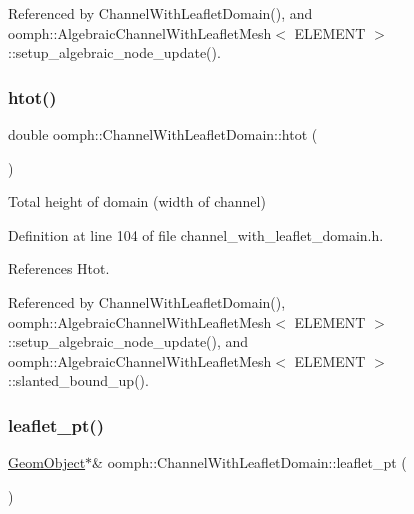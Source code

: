 Referenced by Channel\+With\+Leaflet\+Domain(), and oomph\+::\+Algebraic\+Channel\+With\+Leaflet\+Mesh$<$ E\+L\+E\+M\+E\+N\+T $>$\+::setup\+\_\+algebraic\+\_\+node\+\_\+update().

\mbox{\label{classoomph_1_1ChannelWithLeafletDomain_aaf195c688423473ed97af61f8a1467ab}} 
\subsubsection{\texorpdfstring{htot()}{htot()}}
{\footnotesize\ttfamily double oomph\+::\+Channel\+With\+Leaflet\+Domain\+::htot (\begin{DoxyParamCaption}{ }\end{DoxyParamCaption})\hspace{0.3cm}{\ttfamily [inline]}}



Total height of domain (width of channel) 



Definition at line 104 of file channel\+\_\+with\+\_\+leaflet\+\_\+domain.\+h.



References Htot.



Referenced by Channel\+With\+Leaflet\+Domain(), oomph\+::\+Algebraic\+Channel\+With\+Leaflet\+Mesh$<$ E\+L\+E\+M\+E\+N\+T $>$\+::setup\+\_\+algebraic\+\_\+node\+\_\+update(), and oomph\+::\+Algebraic\+Channel\+With\+Leaflet\+Mesh$<$ E\+L\+E\+M\+E\+N\+T $>$\+::slanted\+\_\+bound\+\_\+up().

\mbox{\label{classoomph_1_1ChannelWithLeafletDomain_a91d7d8d2f564c5e9d2ee07449b2653c9}} 
\subsubsection{\texorpdfstring{leaflet\+\_\+pt()}{leaflet\_pt()}}
{\footnotesize\ttfamily \hyperlink{classoomph_1_1GeomObject}{Geom\+Object}$\ast$\& oomph\+::\+Channel\+With\+Leaflet\+Domain\+::leaflet\+\_\+pt (\begin{DoxyParamCaption}{ }\end{DoxyParamCaption})\hspace{0.3cm}{\ttfamily [inline]}}



